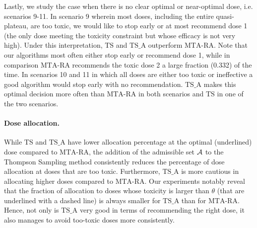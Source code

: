 Lastly, we study the case when there is no clear optimal or near-optimal dose, i.e. scenarios 9-11. In scenario 9 wherein most doses, including the entire quasi-plateau, are too toxic, we would like to stop early or at most recommend dose 1 (the only dose meeting the toxicity constraint but whose efficacy is not very high). Under this interpretation, $\mathrm{TS}$ and $\mathrm{TS}\_\mathrm{A}$ outperform $\mathrm{MTA}$-$\mathrm{RA}$. Note that our algorithms most often either stop early or recommend dose 1, while in comparison $\mathrm{MTA}$-$\mathrm{RA}$ recommends the toxic dose 2 a large fraction (0.332) of the time. In scenarios 10 and 11 in which all doses are either too toxic or ineffective a good algorithm would stop early with no recommendation. %
$\mathrm{TS}\_\mathrm{A}$ makes this optimal decision more often than $\mathrm{MTA}$-$\mathrm{RA}$ in both scenarios and $\mathrm{TS}$ in one of the two scenarios. 



\paragraph{Dose allocation.}
While $\mathrm{TS}$ and $\mathrm{TS}\_\mathrm{A}$ have lower allocation percentage at the optimal (underlined) dose compared to $\mathrm{MTA}$-$\mathrm{RA}$, the addition of the admissible set $\mathcal{A}$ to the Thompson Sampling method consistently reduces the percentage of dose allocation at doses that are too toxic. Furthermore, $\mathrm{TS}\_\mathrm{A}$ is more cautious in allocating higher doses compared to $\mathrm{MTA}$-$\mathrm{RA}$. Our experiments notably reveal that the fraction of allocation to doses whose toxicity is larger than $\theta$ (that are underlined with a dashed line) is always smaller for $\mathrm{TS}\_\mathrm{A}$ than for $\mathrm{MTA}$-$\mathrm{RA}$. Hence, not only is $\mathrm{TS}\_\mathrm{A}$ very good in terms of recommending the right dose, it also manages to avoid too-toxic doses more consistently.



